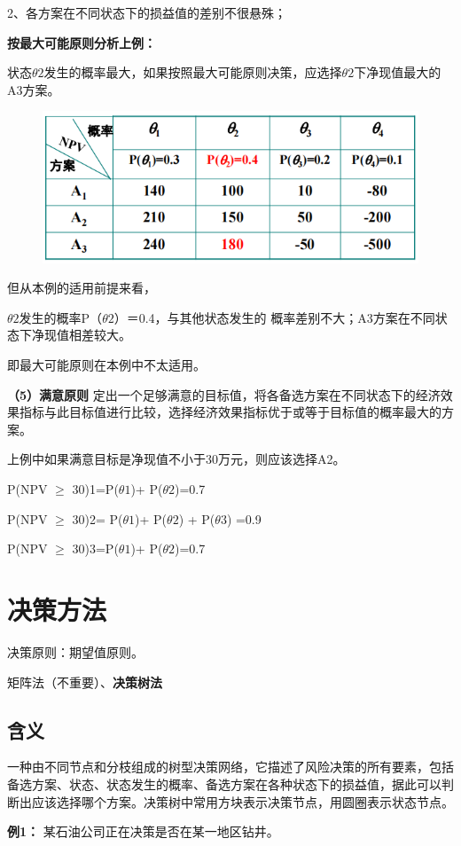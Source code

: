 2、各方案在不同状态下的损益值的差别不很悬殊；

\textbf{按最大可能原则分析上例：}

状态$\theta 2$发生的概率最大，如果按照最大可能原则决策，应选择$\theta 2$下净现值最大的A3方案。

\begin{figure}[H]
    \centering
    \includegraphics[width=0.75\linewidth]{image/最大可能原则分析.png}
\end{figure}

但从本例的适用前提来看，

$\theta 2$发生的概率P（$\theta 2$）＝0.4，与其他状态发生的
概率差别不大；A3方案在不同状态下净现值相差较大。

即最大可能原则在本例中不太适用。

\noindent\textbf{（5）满意原则}
定出一个足够满意的目标值，将各备选方案在不同状态下的经济效果指标与此目标值进行比较，选择经济效果指标优于或等于目标值的概率最大的方案。

上例中如果满意目标是净现值不小于30万元，则应该选择A2。

P(NPV $\geq$ 30)1=P($\theta 1$)+ P($\theta2$)=0.7

P(NPV $\geq$ 30)2= P($\theta 1$)+ P($\theta2$) + P($\theta3$) =0.9

P(NPV $\geq$ 30)3=P($\theta 1$)+ P($\theta2$)=0.7

\section{决策方法}
决策原则：期望值原则。

矩阵法（不重要）、\textbf{决策树法}

\subsection{含义}
一种由不同节点和分枝组成的树型决策网络，它描述了风险决策的所有要素，包括备选方案、状态、状态发生的概率、备选方案在各种状态下的损益值，据此可以判断出应该选择哪个方案。决策树中常用方块表示决策节点，用圆圈表示状态节点。

\textbf{例1：}
某石油公司正在决策是否在某一地区钻井。

